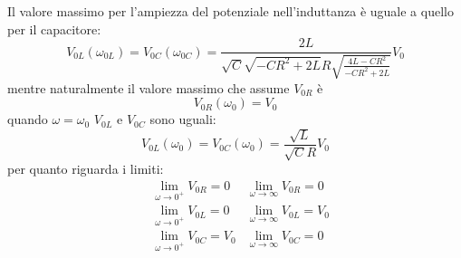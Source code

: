 Il valore massimo per l'ampiezza del potenziale nell'induttanza è uguale a quello per il capacitore:
\begin{equation}
V_{0L}(\omega_{0L})=V_{0C}(\omega_{0C})=\frac{2L}{\sqrt{C}\sqrt{-CR^2+2L}R\sqrt{\frac{4L-CR^2}{-CR^2+2L}}}V_0
\end{equation}
mentre naturalmente il valore massimo che assume $V_{0R}$ è 
\begin{equation}
V_{0R}(\omega_0)=V_0
\end{equation}
quando $\omega=\omega_0$ $V_{0L}$ e $V_{0C}$ sono uguali:
\begin{equation}
V_{0L}(\omega_0)=V_{0C}(\omega_0)=\frac{\sqrt{L}}{\sqrt{C}R}V_0
\end{equation}
per quanto riguarda i limiti:
\begin{subequations}
\begin{align}
&\lim_{\omega\to 0^+}V_{0R}=0&\lim_{\omega\to \infty}V_{0R}=0\\
&\lim_{\omega\to 0^+}V_{0L}=0&\lim_{\omega\to \infty}V_{0L}=V_0\\
&\lim_{\omega\to 0^+}V_{0C}=V_0&\lim_{\omega\to \infty}V_{0C}=0
\end{align}
\end{subequations}

